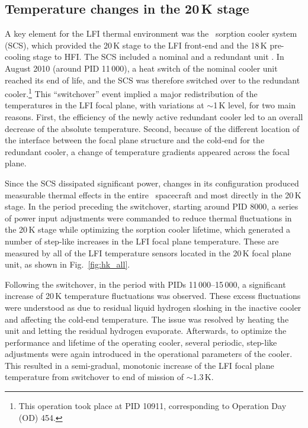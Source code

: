 \documentclass{aa}
\begin{document}
\subsection{Temperature changes in the 20\,K stage}
A key element for the LFI thermal environment was the
\Planck\ sorption cooler system (SCS), which provided the 20\,K stage
to the LFI front-end and the 18\,K pre-cooling stage to HFI. The SCS
included a nominal and a redundant unit \citep{planck2011-1.3}. In
August 2010 (around PID 11\,000), a heat switch of the nominal cooler
unit reached its end of life, and the SCS was therefore switched over
to the redundant cooler.\footnote{This operation took place at PID
  10911, corresponding to Operation Day (OD) 454.}  This ``switchover''
event implied a major redistribution of the temperatures in the LFI
focal plane, with variations at $\sim$1\,K level, for two main
reasons. First, the efficiency of the newly active redundant cooler
led to an overall decrease of the absolute temperature. Second,
because of the different location of the interface between the focal
plane structure and the cold-end for the redundant cooler, a change of
temperature gradients appeared across the focal plane.

Since the SCS dissipated significant power, changes in its
configuration produced measurable thermal effects in the entire \Planck\
spacecraft and most directly in the 20\,K stage. In the period
preceding the switchover, starting around PID 8000, a series of power
input adjustments were commanded to reduce thermal fluctuations in the
20\,K stage while optimizing the sorption cooler lifetime, which
generated a number of step-like increases in the LFI focal plane
temperature. These are measured by all of the LFI temperature 
sensors located in the 20\,K focal plane unit, as shown in Fig.~\ref{fig:hk_all}.

Following the switchover, in the period with PIDs 11\,000--15\,000, a
significant increase of 20\,K temperature fluctuations was
observed. These excess fluctuations were understood as due to residual
liquid hydrogen sloshing in the inactive cooler and affecting the
cold-end temperature. The issue was resolved by heating the unit and
letting the residual hydrogen evaporate. Afterwards, to optimize the
performance and lifetime of the operating cooler, several periodic,
step-like adjustments were again introduced in the operational
parameters of the cooler. This resulted in a semi-gradual, monotonic
increase of the LFI focal plane temperature from switchover to end of
mission of $\sim$1.3\,K.
\end{document}
